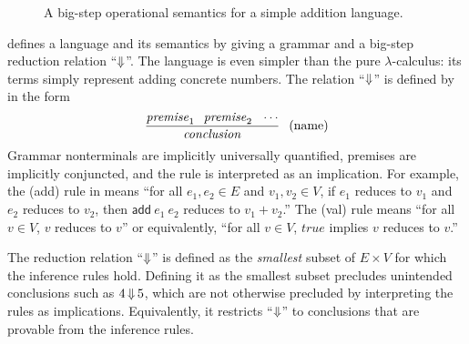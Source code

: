 \begin{figure*}[tb]\centering
{}
\tab\tab
{}
\caption[ ]{A big-step operational semantics for a simple addition language.}
\label{fig:add-language}
\end{figure*}

 defines a language and its semantics by giving a grammar and a big-step reduction relation ``$\operatorname{\Downarrow}$''.
The language is even simpler than the pure $\lambda$-calculus: its terms simply represent adding concrete numbers.
The relation ``$\operatorname{\Downarrow}$'' is defined by  in the form
\begin{equation}
	\dfrac{\mathit{premise}_1 \;\;\, \mathit{premise}_2 \;\;\, \cdots}{\mathit{conclusion}} \;\;\, \text{(name)}
\end{equation}
Grammar nonterminals are implicitly universally quantified, premises are implicitly conjuncted, and the rule is interpreted as an implication.
For example, the (add) rule in  means ``for all $e_1,e_2 \in E$ and $v_1,v_2 \in V$, if $e_1$ reduces to $v_1$ and $e_2$ reduces to $v_2$, then $\mathsf{add}~e_1~e_2$ reduces to $v_1 + v_2$.''
The (val) rule means ``for all $v \in V$, $v$ reduces to $v$'' or equivalently, ``for all $v \in V$, $\mathit{true}$ implies $v$ reduces to $v$.''

The reduction relation ``$\operatorname{\Downarrow}$'' is defined as the \emph{smallest} subset of $E \times V$ for which the inference rules hold.
Defining it as the smallest subset precludes unintended conclusions such as $4 \operatorname{\Downarrow} 5$, which are not otherwise precluded by interpreting the rules as implications.
Equivalently, it restricts ``$\operatorname{\Downarrow}$'' to conclusions that are provable from the inference rules.

